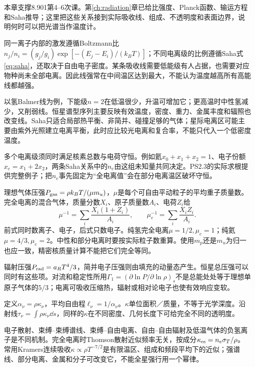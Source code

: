 本章支撑8.901第4--6次课。第\ref{ch:radiation}章已给比强度、Planck函数、输运方程和Saha推导；这里把这些关系接到实际吸收线、组成、不透明度和表面边界，说明何时可以把光谱当作温度计。

同一离子内部的激发遵循Boltzmann比$n_j/n_i=(g_j/g_i)\exp[-(E_j-E_i)/(k_BT)]$；不同电离级的比例遵循Saha式\eqref{eq:saha}，还取决于自由电子密度。某条吸收线需要低能级有人占据，也需要对应物种尚未全部电离。因此线强常在中间温区达到最大，不能认为温度越高所有高能线都越强。

以氢Balmer线为例，下能级$n=2$在低温很少，升温可增加它；更高温时中性氢减少，又削弱线。恒星谱型序列主要反映有效温度，密度、重力、金属丰度和辐照也改变线。Saha只适合局部热平衡、非简并、碰撞足够的气体；星际电离区可能主要由紫外光照建立电离平衡，此时应比较光电离和复合率，不能只代入一个低密度温度。

多个电离级须同时满足核素总数与电荷守恒。例如氦$x_0+x_1+x_2=1$、电子份额$x_e=x_1+2x_2$，两条Saha关系中的$n_e$由这组未知量共同决定。PS2.3的实际求根提供完整例子；把$n_e$事先固定为“全电离值”会在部分电离温区破坏守恒。

理想气体压强$P_{\rm gas}=\rho k_BT/(\mu m_u)$，$\mu$是每个可自由平动粒子的平均重子质量数。完全电离的混合气体，质量分数$X_i$、原子质量数$A_i$、电荷$Z_i$给
\[
 \mu^{-1}=\sum_i\frac{X_i(1+Z_i)}{A_i},\qquad
 \mu_e^{-1}=\sum_i\frac{X_iZ_i}{A_i}.
\]
前式同时数离子、电子，后式只数电子。纯氢完全电离$\mu=1/2,\mu_e=1$；纯氦$\mu=4/3,\mu_e=2$。中性和部分电离时要按实际粒子数重算。使用$m_p$还是$m_u$为归一也应一致，精密核质量计算不能把它们完全等同。

辐射压强$P_{\rm rad}=a_RT^4/3$，简并电子压强则由填充的动量态产生。恒星总压强可以同时有这些项。对流和稳定性所用$\Gamma_1=(\partial\ln P/\partial\ln\rho)_s$不是总能处处等于理想单原子气体的$5/3$；电离可吸收压缩热，辐射或相对论电子也使有效响应变软。

定义$\alpha_\nu=\rho\kappa_\nu$，平均自由程$\ell_\nu=1/\alpha_\nu$。$\kappa$单位面积／质量，不等于光学深度。沿射线$\tau_\nu=\int\rho\kappa_\nu\dd s$，同样的$\kappa$在不同密度、几何长度下可给完全不同的透明度。

电子散射、束缚--束缚谱线、束缚--自由电离、自由--自由辐射及低温气体的负氢离子是不同机制。完全电离时Thomson散射近似频率无关，按成分$\kappa_{\rm es}=n_e\sigma_T/\rho$。常用Kramers连续吸收$\kappa\propto\rho T^{-7/2}$是有限温区、组成和频段平均下的近似；强谱线、部分电离、金属和分子可改变它，不能全星强行用一个幂律。

